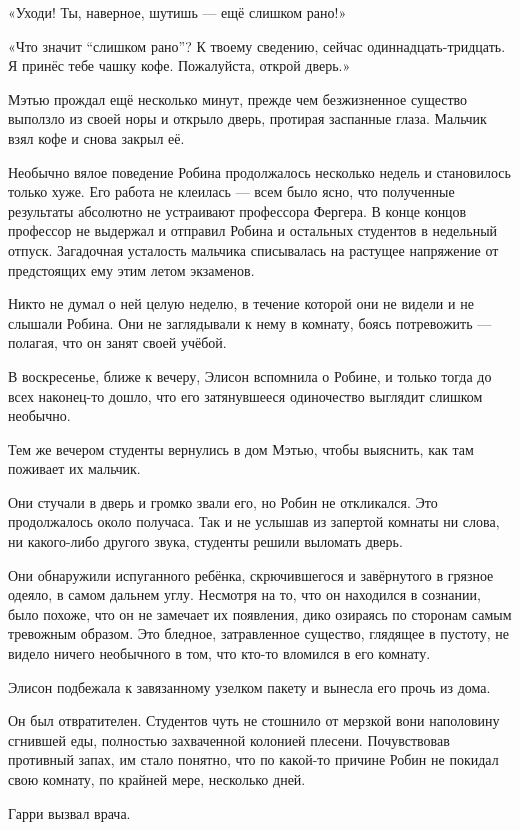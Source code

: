 \documentclass[a5paper, 9pt,
final, openany, twoside=true]{memoir}
\begin{document}
«Уходи! Ты, наверное, шутишь — ещё слишком рано!»

«Что значит ``слишком рано''? К твоему сведению, сейчас одиннадцать-тридцать. Я принёс тебе чашку кофе. Пожалуйста, открой дверь.»

Мэтью прождал ещё несколько минут, прежде чем безжизненное существо выползло из своей норы и открыло дверь, протирая заспанные глаза. Мальчик взял кофе и снова закрыл её.\bigskip

Необычно вялое поведение Робина продолжалось несколько недель и становилось только хуже. Его работа не клеилась — всем было ясно, что полученные результаты абсолютно не устраивают профессора Фергера. В конце концов профессор не выдержал и отправил Робина и остальных студентов в недельный отпуск. Загадочная усталость мальчика списывалась на растущее напряжение от предстоящих ему этим летом экзаменов.

Никто не думал о ней целую неделю, в течение которой они не видели и не слышали Робина. Они не заглядывали к нему в комнату, боясь потревожить — полагая, что он занят своей учёбой.

В воскресенье, ближе к вечеру, Элисон вспомнила о Робине, и только тогда до всех наконец-то дошло, что его затянувшееся одиночество выглядит слишком необычно.

Тем же вечером студенты вернулись в дом Мэтью, чтобы выяснить, как там поживает их мальчик.

Они стучали в дверь и громко звали его, но Робин не откликался. Это продолжалось около получаса. Так и не услышав из запертой комнаты ни слова, ни какого-либо другого звука, студенты решили выломать дверь.

Они обнаружили испуганного ребёнка, скрючившегося и завёрнутого в грязное одеяло, в самом дальнем углу. Несмотря на то, что он находился в сознании, было похоже, что он не замечает их появления, дико озираясь по сторонам самым тревожным образом. Это бледное, затравленное существо, глядящее в пустоту, не видело ничего необычного в том, что кто-то вломился в его комнату.

Элисон подбежала к завязанному узелком пакету и вынесла его прочь из дома.

Он был отвратителен. Студентов чуть не стошнило от мерзкой вони наполовину сгнившей еды, полностью захваченной колонией плесени. Почувствовав противный запах, им стало понятно, что по какой-то причине Робин не покидал свою комнату, по крайней мере, несколько дней.

Гарри вызвал врача.\bigskip
\end{document}
